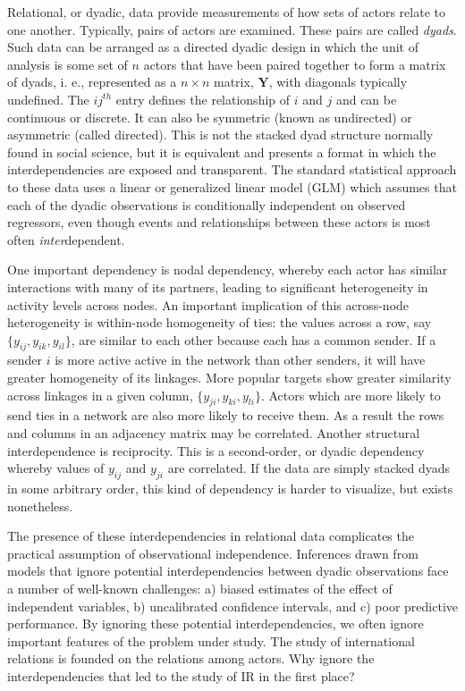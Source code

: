 \documentclass[12pt]{amsart}
\begin{document}
Relational, or dyadic, data provide measurements of how sets of actors relate to one another. Typically, pairs of actors are examined. These pairs are called \textit{dyads}. Such data can be arranged as a directed dyadic design in which the unit of analysis is some set of $n$ actors that have been paired together to form a matrix of dyads, i. e., represented as a $n \times n$ matrix, $\mathbf{Y}$, with diagonals typically undefined. The $ij^{th}$ entry defines the relationship of $i$ and $j$ and can be continuous or discrete. It can also be symmetric (known as undirected) or asymmetric (called directed). This is not the stacked dyad structure normally found in social science, but it is equivalent and presents a format in which the interdependencies are exposed and transparent. The standard statistical approach to these data uses a linear or generalized linear model (GLM) which assumes that each of the dyadic observations is conditionally independent on observed regressors, even though events and relationships between these actors is most often \textit{inter}dependent. 

One important dependency is nodal dependency, whereby each actor has similar interactions with many of its partners, leading to significant heterogeneity in activity levels across nodes. An important implication of this across-node heterogeneity is within-node homogeneity of ties: the values across a row, say $\{y_{ij},y_{ik},y_{il}\}$, are similar to each other because each has a common sender. If a sender $i$ is more active active in the network than other senders, it will have greater homogeneity of its linkages. More popular targets show greater similarity across linkages in a given column, $\{y_{ji},y_{ki},y_{li}\}$. Actors which are more likely to send ties in a network are also more likely to receive them. As a result the rows and columns in an adjacency matrix may be correlated. Another structural interdependence is reciprocity. This is a second-order, or dyadic dependency whereby values of $y_{ij}$ and $y_{ji}$ are correlated. If the data are simply stacked dyads in some arbitrary order, this kind of dependency is harder to visualize, but exists nonetheless.

The presence of these interdependencies in relational data complicates the practical assumption of observational independence.  Inferences drawn from models that ignore potential interdependencies between dyadic observations face a number of well-known challenges: a) biased estimates of the effect of independent variables, b) uncalibrated confidence intervals, and c) poor predictive performance. By ignoring these potential interdependencies, we often ignore important features of the problem under study. The study of international relations is founded on the relations among actors. Why ignore the interdependencies that led to the study of IR in the first place?
\end{document}
